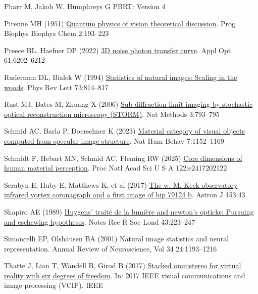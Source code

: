 \documentclass[
  letterpaper,
]{book}
\newlength{\cslhangindent}
\newenvironment{CSLReferences}[2] %
 {\begin{list}{}{%
  \setlength{\itemindent}{0pt}
  \setlength{\leftmargin}{0pt}
  \setlength{\parsep}{0pt}
  \ifodd #1
   \setlength{\leftmargin}{\cslhangindent}
   \setlength{\itemindent}{-1\cslhangindent}
  \fi
  \setlength{\itemsep}{#2\baselineskip}}}
 {\end{list}}
\begin{document}
\begin{CSLReferences}{1}{1}
Pharr M, Jakob W, Humphreys G {PBRT}: {Version} 4

Pirenne MH (1951)
\href{http://dx.doi.org/10.1016/s0096-4174(18)30026-x}{Quantum physics
of vision theoretical discussion}. Prog Biophys Biophys Chem 2:193--223

Preece BL, Haefner DP (2022)
\href{http://dx.doi.org/10.1364/AO.452166}{{3D} noise photon transfer
curve}. Appl Opt 61:6202--6212

Ruderman DL, Bialek W (1994)
\href{http://dx.doi.org/10.1103/PhysRevLett.73.814}{Statistics of
natural images: Scaling in the woods}. Phys Rev Lett 73:814--817

Rust MJ, Bates M, Zhuang X (2006)
\href{http://dx.doi.org/10.1038/nmeth929}{Sub-diffraction-limit imaging
by stochastic optical reconstruction microscopy ({STORM})}. Nat Methods
3:793--795

Schmid AC, Barla P, Doerschner K (2023)
\href{https://www.nature.com/articles/s41562-023-01601-0}{Material
category of visual objects computed from specular image structure}. Nat
Hum Behav 7:1152--1169

Schmidt F, Hebart MN, Schmid AC, Fleming RW (2025)
\href{http://dx.doi.org/10.1073/pnas.2417202122}{Core dimensions of
human material perception}. Proc Natl Acad Sci U S A 122:e2417202122

Serabyn E, Huby E, Matthews K, et al (2017)
\href{http://dx.doi.org/10.3847/1538-3881/153/1/43}{The w. {M}. Keck
observatory infrared vortex coronagraph and a first image of hip 79124
b}. Astron J 153:43

Shapiro AE (1989)
\href{http://dx.doi.org/10.1098/rsnr.1989.0016}{Huygens' traité de la
lumière and newton's opticks: Pursuing and eschewing hypotheses}. Notes
Rec R Soc Lond 43:223--247

Simoncelli EP, Olshausen BA (2001) Natural image statistics and neural
representation. Annual Review of Neuroscience, Vol 34 24:1193--1216

Thatte J, Lian T, Wandell B, Girod B (2017)
\href{http://dx.doi.org/10.1109/vcip.2017.8305085}{Stacked omnistereo
for virtual reality with six degrees of freedom}. In: 2017 IEEE visual
communications and image processing (VCIP). IEEE


\end{CSLReferences}
\end{document}
